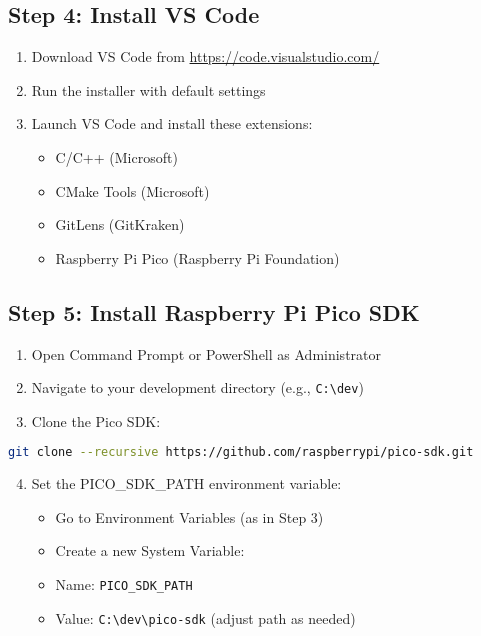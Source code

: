 \documentclass[11pt,a4paper]{article}
\begin{document}
\subsection{Step 4: Install VS Code}
\begin{enumerate}
    \item Download VS Code from \url{https://code.visualstudio.com/}
    \item Run the installer with default settings
    \item Launch VS Code and install these extensions:
    \begin{itemize}
        \item C/C++ (Microsoft)
        \item CMake Tools (Microsoft)
        \item GitLens (GitKraken)
        \item Raspberry Pi Pico (Raspberry Pi Foundation)
    \end{itemize}
\end{enumerate}

\subsection{Step 5: Install Raspberry Pi Pico SDK}
\begin{enumerate}
    \item Open Command Prompt or PowerShell as Administrator
    \item Navigate to your development directory (e.g., \texttt{C:\textbackslash dev})
    \item Clone the Pico SDK:
\end{enumerate}

\begin{lstlisting}[language=bash]
git clone --recursive https://github.com/raspberrypi/pico-sdk.git
\end{lstlisting}

\begin{enumerate}
    \setcounter{enumi}{3}
    \item Set the PICO\_SDK\_PATH environment variable:
    \begin{itemize}
        \item Go to Environment Variables (as in Step 3)
        \item Create a new System Variable:
        \item Name: \texttt{PICO\_SDK\_PATH}
        \item Value: \texttt{C:\textbackslash dev\textbackslash pico-sdk} (adjust path as needed)
    \end{itemize}
\end{enumerate}
\end{document}
